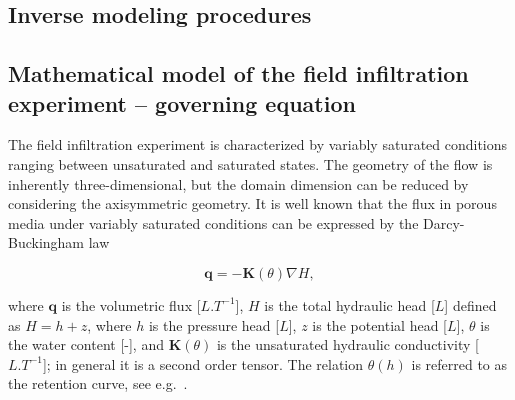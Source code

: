 \documentclass[review]{myarticle}
\newenvironment{lineq}
    {\begin{linenomath*}
    \begin{equation}
    }
    { 
    \end{equation} 
    \end{linenomath*}
    }
\renewcommand{\vec}{\mathbf}
\begin{document}
\subsection{Inverse modeling procedures}
\label{invproc}

\subsection{Mathematical model of the field infiltration experiment -- governing equation}%
\label{goveq}


The field infiltration experiment is characterized by variably saturated conditions ranging between unsaturated and saturated states. The geometry of the flow is inherently three-dimensional, but the domain dimension can be reduced by considering the axisymmetric geometry. It is well known that the flux in porous media under variably saturated conditions can be expressed by the Darcy-Buckingham law~\citep{buckingham} \begin{lineq}\label{darcybuck}\vec{q} = -\mathbf{K}(\theta) \nabla H,\end{lineq} where $\vec{q}$ is the volumetric flux [$L.T^{-1}$], $H$ is the total hydraulic head [$L$] defined as $H=h+z$, where $h$ is the pressure head [$L$], $z$ is the potential head [$L$], $\theta$ is the water content [-], and $\mathbf{K}(\theta)$ is the unsaturated hydraulic conductivity  [$L.T^{-1}$]; in general it is a  second order tensor. The relation $\theta(h)$ is referred to as the retention curve, see e.g.~\citep{vangenuchten}.
\end{document}
